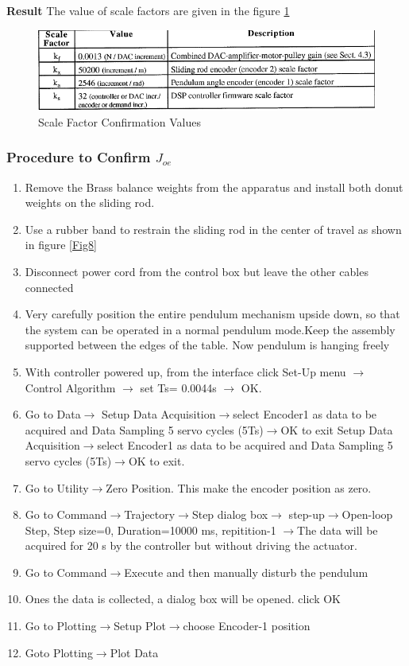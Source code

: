 \documentclass[12pt, a4paper]{article}
\begin{document}
\textbf{Result} The value of scale factors are given in the figure \ref{Fig7}
\begin{figure}[H]
\centering
\includegraphics[width = \textwidth]{kxkavalues.png}
\caption{Scale Factor Confirmation Values}
\label{Fig7}
\end{figure}
\subsubsection{Procedure to Confirm $J_{oe}$}
\begin{enumerate}
\item Remove the Brass balance weights from the apparatus and install both donut weights on the sliding rod.
\item Use a rubber band to restrain the sliding rod in the center of travel as shown in figure \ref{Fig8}
\item Disconnect power cord from the control box but leave the other cables connected
\item Very carefully position the entire pendulum mechanism upside down, so that the system can be operated in a normal pendulum mode.Keep the assembly supported between the edges of the table. Now pendulum is hanging freely
\item With controller powered up, from the interface click Set-Up menu $\rightarrow$ Control Algorithm $\rightarrow$ set Ts= 0.0044s $\rightarrow$ OK.
\item Go to Data$\rightarrow$ Setup Data Acquisition$\rightarrow$select Encoder1 as data to be acquired and Data Sampling 5 servo cycles (5Ts)$\rightarrow$OK to exit Setup Data Acquisition$\rightarrow$select Encoder1 as data to be acquired and Data Sampling 5 servo cycles (5Ts)$\rightarrow$OK to exit.
\item Go to Utility$\rightarrow$Zero Position. This make the encoder position as zero.
\item Go to Command$\rightarrow$Trajectory$\rightarrow$Step dialog box$\rightarrow$ step-up$\rightarrow$Open-loop Step, Step size=0, Duration=10000 ms, repitition-1 $\rightarrow$The data will be acquired for 20 s by the controller but without driving the actuator.
\item Go to Command$\rightarrow$Execute and then manually disturb the pendulum
\item Ones the data is collected, a dialog box will be opened. click OK
\item Go to Plotting$\rightarrow$Setup Plot$\rightarrow$choose Encoder-1 position
\item Goto Plotting$\rightarrow$Plot Data
\end{enumerate}
\end{document}
